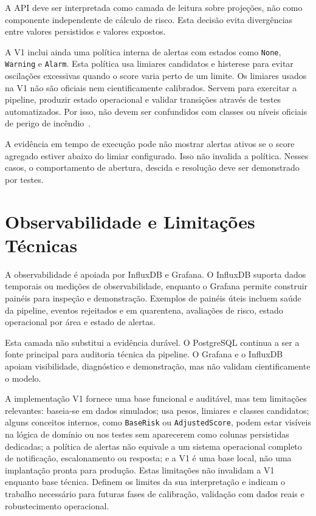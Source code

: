A API deve ser interpretada como camada de leitura sobre projeções, não como componente independente de cálculo de risco. Esta decisão evita divergências entre valores persistidos e valores expostos.

A V1 inclui ainda uma política interna de alertas com estados como \texttt{None}, \texttt{Warning} e \texttt{Alarm}. Esta política usa limiares candidatos e histerese para evitar oscilações excessivas quando o score varia perto de um limite. Os limiares usados na V1 não são oficiais nem cientificamente calibrados. Servem para exercitar a pipeline, produzir estado operacional e validar transições através de testes automatizados. Por isso, não devem ser confundidos com classes ou níveis oficiais de perigo de incêndio~\citep{ipma_fwi,ipma_pir_rcm,copernicus_effis}.

A evidência em tempo de execução pode não mostrar alertas ativos se o score agregado estiver abaixo do limiar configurado. Isso não invalida a política. Nesses casos, o comportamento de abertura, descida e resolução deve ser demonstrado por testes.

\section{Observabilidade e Limitações Técnicas}

A observabilidade é apoiada por InfluxDB e Grafana. O InfluxDB suporta dados temporais ou medições de observabilidade, enquanto o Grafana permite construir painéis para inspeção e demonstração. Exemplos de painéis úteis incluem saúde da pipeline, eventos rejeitados e em quarentena, avaliações de risco, estado operacional por área e estado de alertas.

Esta camada não substitui a evidência durável. O PostgreSQL continua a ser a fonte principal para auditoria técnica da pipeline. O Grafana e o InfluxDB apoiam visibilidade, diagnóstico e demonstração, mas não validam cientificamente o modelo.

A implementação V1 fornece uma base funcional e auditável, mas tem limitações relevantes: baseia-se em dados simulados; usa pesos, limiares e classes candidatos; alguns conceitos internos, como \texttt{BaseRisk} ou \texttt{AdjustedScore}, podem estar visíveis na lógica de domínio ou nos testes sem aparecerem como colunas persistidas dedicadas; a política de alertas não equivale a um sistema operacional completo de notificação, escalonamento ou resposta; e a V1 é uma base local, não uma implantação pronta para produção.
Estas limitações não invalidam a V1 enquanto base técnica. Definem os limites da sua interpretação e indicam o trabalho necessário para futuras fases de calibração, validação com dados reais e robustecimento operacional.
